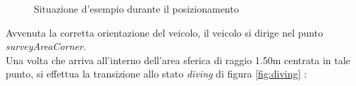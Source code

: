 \documentclass{article}
\begin{document}
            
            \begin{figure} [ht]
                \caption{Situazione d'esempio durante il posizionamento}
                \label{fig:sppos}
            \end{figure}

            Avvenuta la corretta orientazione del veicolo, il veicolo si dirige nel punto \emph{surveyAreaCorner}. \\
            Una volta che arriva all'interno dell'area sferica di raggio 1.50m centrata in tale punto, si effettua la transizione allo stato \emph{diving} di figura \ref{fig:diving} : 
\end{document}
